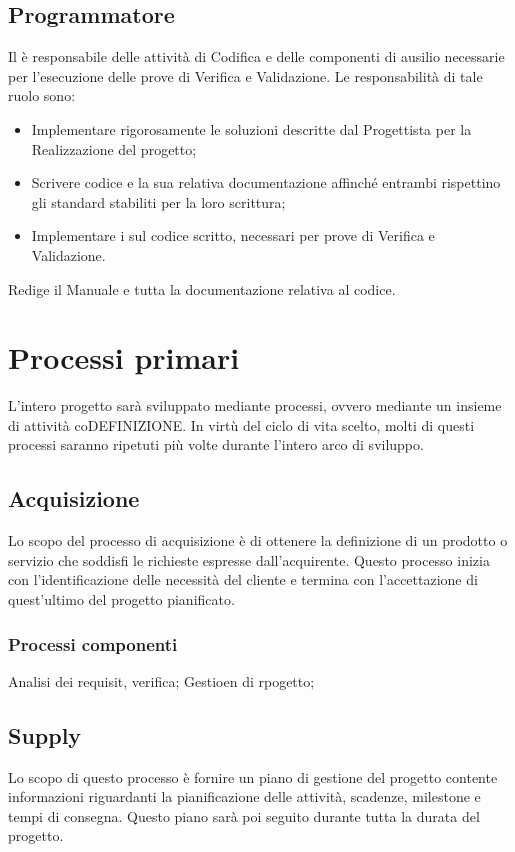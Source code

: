 \subsection{Programmatore}
\label{2.6}
Il  è responsabile delle attività di Codifica e delle componenti di ausilio
necessarie per l'esecuzione delle prove di Verifica e Validazione. Le responsabilità di tale ruolo sono:
\begin{itemize}
\item Implementare rigorosamente le soluzioni descritte dal Progettista per la Realizzazione del progetto;
\item Scrivere codice e la sua relativa documentazione affinché entrambi rispettino gli standard stabiliti per la loro scrittura;
\item Implementare i  sul codice scritto, necessari per prove di Verifica e Validazione.
\end{itemize}
Redige il Manuale  e tutta la documentazione relativa al codice.

\newpage
\section{Processi primari}
L'intero progetto sarà sviluppato mediante processi, ovvero mediante un insieme di attività coDEFINIZIONE.
In virtù del ciclo di vita scelto, molti di questi processi saranno ripetuti più volte durante l'intero arco di sviluppo.

\subsection{Acquisizione}
Lo scopo del processo di acquisizione è di ottenere la definizione di un prodotto o servizio che soddisfi le richieste espresse dall'acquirente.
Questo processo inizia con l'identificazione delle necessità del cliente e termina con l'accettazione di quest'ultimo del progetto pianificato.
\subsubsection{Processi componenti}
Analisi dei requisit, verifica; Gestioen di rpogetto;
\subsection{Supply}
Lo scopo di questo processo è fornire un piano di gestione del progetto contente informazioni riguardanti la pianificazione delle attività, scadenze, milestone e tempi di consegna. Questo piano sarà poi seguito durante tutta la durata del progetto.
